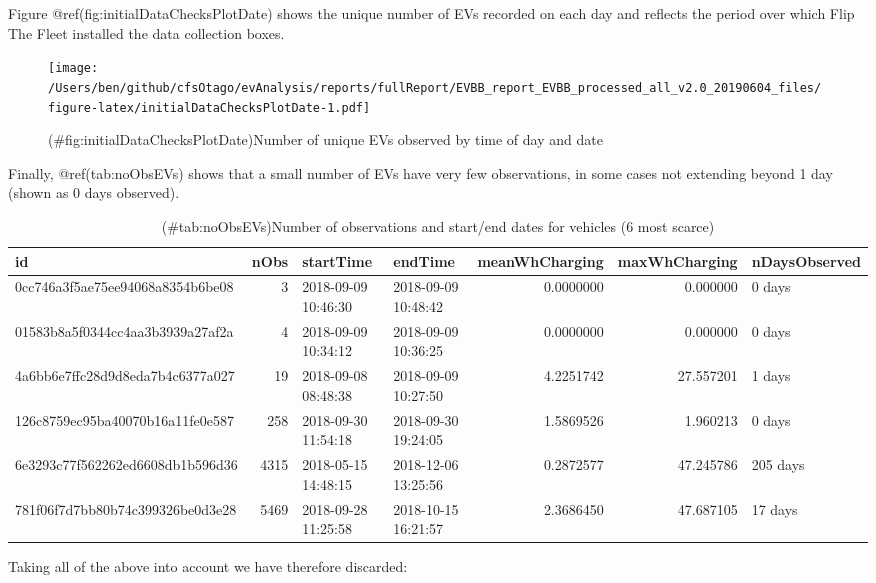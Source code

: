 \documentclass[]{article}
\begin{document}
Figure @ref(fig:initialDataChecksPlotDate) shows the unique number of EVs recorded on each day and reflects the period over which Flip The Fleet installed the data collection boxes.

\begin{figure}
\centering
\texttt{[image: /Users/ben/github/cfsOtago/evAnalysis/reports/fullReport/EVBB\_report\_EVBB\_processed\_all\_v2.0\_20190604\_files/figure-latex/initialDataChecksPlotDate-1.pdf]}
\caption{(\#fig:initialDataChecksPlotDate)Number of unique EVs observed by time of day and date}
\end{figure}

Finally, @ref(tab:noObsEVs) shows that a small number of EVs have very few observations, in some cases not extending beyond 1 day (shown as 0 days observed).

\begin{table}[t]

\caption{(\#tab:noObsEVs)Number of observations and start/end dates for vehicles (6 most scarce)}
\centering
\begin{tabular}{l|r|l|l|r|r|l}
\hline
id & nObs & startTime & endTime & meanWhCharging & maxWhCharging & nDaysObserved\\
\hline
0cc746a3f5ae75ee94068a8354b6be08 & 3 & 2018-09-09 10:46:30 & 2018-09-09 10:48:42 & 0.0000000 & 0.000000 & 0 days\\
\hline
01583b8a5f0344cc4aa3b3939a27af2a & 4 & 2018-09-09 10:34:12 & 2018-09-09 10:36:25 & 0.0000000 & 0.000000 & 0 days\\
\hline
4a6bb6e7ffc28d9d8eda7b4c6377a027 & 19 & 2018-09-08 08:48:38 & 2018-09-09 10:27:50 & 4.2251742 & 27.557201 & 1 days\\
\hline
126c8759ec95ba40070b16a11fe0e587 & 258 & 2018-09-30 11:54:18 & 2018-09-30 19:24:05 & 1.5869526 & 1.960213 & 0 days\\
\hline
6e3293c77f562262ed6608db1b596d36 & 4315 & 2018-05-15 14:48:15 & 2018-12-06 13:25:56 & 0.2872577 & 47.245786 & 205 days\\
\hline
781f06f7d7bb80b74c399326be0d3e28 & 5469 & 2018-09-28 11:25:58 & 2018-10-15 16:21:57 & 2.3686450 & 47.687105 & 17 days\\
\hline
\end{tabular}
\end{table}

Taking all of the above into account we have therefore discarded:
\end{document}
